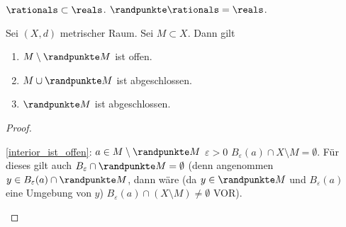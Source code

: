 \begin{beispiel*}
    \( \rationals\subset \reals \). \( \randpunkte \rationals =\reals\).
\end{beispiel*}
\begin{satz}
    Sei \( (X,d) \) metrischer Raum. Sei \( M\subset X \). Dann gilt
    \begin{enumerate}
        \item \label{interior_ist_offen}\( M\setminus \randpunkte M \) ist offen.
        \item \label{abschluss_ist_geschlossen}\( M\cup \randpunkte M \) ist abgeschlossen.
        \item \label{rand_ist_geschlossen}\( \randpunkte M \) ist abgeschlossen.
    \end{enumerate}
\end{satz}
\begin{proof}
    \begin{proofdescription}
        
        \item[\ref{interior_ist_offen}:] \( a\in M\setminus \randpunkte M \) \timplies \texists \( \varepsilon>0 \) \sd \( B_\varepsilon(a)\cap X\setminus M = \emptyset \). Für dieses gilt auch \( B_\varepsilon\cap \randpunkte M=\emptyset\) (denn angenommen \texists \( y\in B_\varepsilon(a)\cap \randpunkte M \),  dann wäre (da \( y\in \randpunkte M \) und \( B_\varepsilon(a) \) eine Umgebung von \( y \)) \( B_\varepsilon(a)\cap (X\setminus M)\neq \emptyset \) \contra \textsc{VOR}).
        

\end{proofdescription}
\end{proof}
